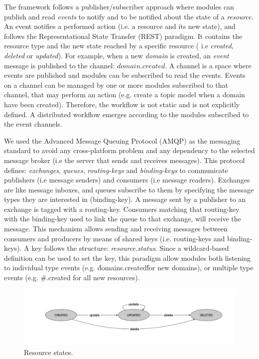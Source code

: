 The framework follows a publisher/subscriber approach where modules can publish and read \textit{events} to notify and to be notified about the state of a \textit{resource}. An event notifies a performed action (i.e. a resource and its new state), and follows the Representational State Transfer (REST)\cite{Fielding2002} paradigm. It contains the resource type and the new state reached by a specific resource ( i.e \textit{created}, \textit{deleted} or \textit{updated}). For example, when a new \textit{domain} is created, an \textit{event} message is published to the channel: $domain.created$. A channel is a space where events are published and modules can be subscribed to read the events. Events on a channel can be managed by one or more modules subscribed to that channel, that may perform an action (e.g. create a topic model when a domain have been created). Therefore, the workflow is not static and is not explicitly defined. A distributed workflow emerges according to the modules subscribed to the event channels.

We used the Advanced Message Queuing Protocol (AMQP) as the messaging standard to avoid any cross-platform problem and any dependency to the selected message broker (i.e the server that sends and receives messages). This protocol defines: \textit{exchanges}, \textit{queues}, \textit{routing-keys} and \textit{binding-keys} to communicate publishers (i.e message senders) and consumers (i.e message readers). Exchanges are like message inboxes, and queues subscribe to them by specifying the message types they are interested in (binding-key). A message sent by a publisher to an exchange is tagged with a routing-key. Consumers matching that routing-key with the binding-key used to link the queue to that exchange, will receive the message. This mechanism allows sending and receiving messages between consumers and producers by means of shared keys (i.e. routing-keys and binding-keys). A key follows the structure: \textit{resource.status}. Since a wildcard-based definition can be used to set the key, this paradigm allow modules both listening to individual type events (e.g. \'domains.created\' for new domains), or multiple type events (e.g. \#.created for all new resources).


\begin{figure}
  \includegraphics[scale=0.3]{resource-states}
  \caption{Resource states.}
  \label{fig:librairy-states}
\end{figure}


